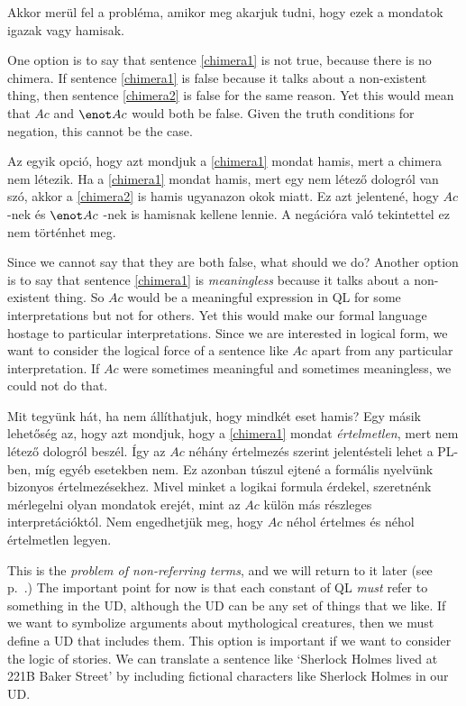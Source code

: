 Akkor merül fel a probléma, amikor meg akarjuk tudni, hogy ezek a mondatok igazak vagy hamisak.

One option is to say that sentence \ref{chimera1} is not true, because there is no chimera. If sentence \ref{chimera1} is false because it talks about a non-existent thing, then sentence \ref{chimera2} is false for the same reason. Yet this would mean that $Ac$ and $\enot Ac$ would both be false. Given the truth conditions for negation, this cannot be the case.

Az egyik opció, hogy azt mondjuk a \ref{chimera1} mondat hamis, mert a chimera nem létezik. Ha a \ref{chimera1} mondat hamis, mert egy nem létező dologról van szó, akkor a \ref{chimera2} is hamis ugyanazon okok miatt. Ez azt jelentené, hogy $Ac$ -nek és $\enot Ac$ -nek is hamisnak kellene lennie.  A negációra való tekintettel ez nem történhet meg.


Since we cannot say that they are both false, what should we do? Another option is to say that sentence \ref{chimera1} is \emph{meaningless} because it talks about a non-existent thing. So $Ac$ would be a meaningful expression in QL for some interpretations but not for others. Yet this would make our formal language hostage to particular interpretations. Since we are interested in logical form, we want to consider the logical force of a sentence like $Ac$ apart from any particular interpretation. If $Ac$ were sometimes meaningful and sometimes meaningless, we could not do that.

Mit tegyünk hát, ha nem állíthatjuk, hogy mindkét eset hamis? Egy másik lehetőség az, hogy azt mondjuk, hogy a \ref{chimera1} mondat \emph{értelmetlen}, mert nem létező dologról beszél. Így az $Ac$ néhány értelmezés szerint jelentésteli lehet a PL-ben, míg egyéb esetekben nem. Ez azonban túszul ejtené a formális nyelvünk bizonyos értelmezésekhez. Mivel minket a logikai formula érdekel, szeretnénk mérlegelni olyan mondatok erejét, mint az $Ac$ külön más részleges interpretációktól. Nem engedhetjük meg, hogy $Ac$ néhol értelmes és néhol értelmetlen legyen. 

This is the \emph{problem of non-referring terms}, and we will return to it later (see p.~\pageref{subsec.defdesc}.) The important point for now is that each constant of QL \emph{must} refer to something in the UD, although the UD can be any set of things that we like. If we want to symbolize arguments about mythological creatures, then we must define a UD that includes them. This option is important if we want to consider the logic of stories. We can translate a sentence like `Sherlock Holmes lived at 221B Baker Street' by including fictional characters like Sherlock Holmes in our UD.

